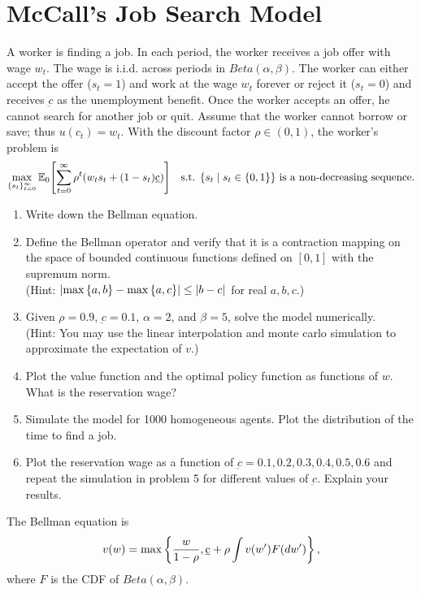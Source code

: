 \documentclass[12pt]{article}
\begin{document}
\section{McCall's Job Search Model}
A worker is finding a job. In each period, the worker receives 
a job offer with wage $w_t$. The wage is i.i.d. across periods 
in $Beta(\alpha,\beta)$. The worker can either 
accept the offer ($s_t=1$) and work at the wage $w_t$ forever 
or reject it ($s_t=0$) and receives $\underbar{c}$ as the 
unemployment benefit. Once the worker accepts an offer, he 
cannot search for another job or quit. Assume that the worker 
cannot borrow or save; thus $u(c_t)=w_t$. 
With the discount factor $\rho\in(0,1)$, the worker's problem 
is 
\begin{equation*}
    \max_{\{s_t\}_{t=0}^\infty} \E_0\sbrc{\sum_{t=0}^\infty \rho^t(w_ts_t+(1-s_t)\underbar{c})}\quad \text{s.t. $\Set{s_t}{s_t\in\set{0,1}}$ is a non-decreasing sequence}.
\end{equation*}
\begin{enumerate}
    \item Write down the Bellman equation.
    \item Define the Bellman operator and verify that it is a 
    contraction mapping on the space of bounded continuous functions 
    defined on $[0,1]$ with the supremum norm.\\
    (Hint: $\left\lvert {\max\left\{ {a,b} \right\}-\max\left\{ {a,c} \right\}} \right\rvert\leq\left\lvert {b-c} \right\rvert$ for real $a,b,c$.)
    \item Given $\rho = 0.9$, $\underbar{c} = 0.1$, $\alpha = 2$, 
    and $\beta = 5$, solve the model numerically.\\
    (Hint: You may use the linear interpolation and monte carlo simulation to 
    approximate the expectation of $v$.)
    \item Plot the value function and the optimal policy function as functions 
    of $w$. What is the reservation wage? 
    \item Simulate the model for 1000 homogeneous agents. Plot the distribution 
    of the time to find a job. 
    \item Plot the reservation wage as a function of $\underbar{c} = 0.1, 0.2, 0.3,
    0.4, 0.5, 0.6$ and repeat the simulation in problem 5 for different values of 
    $\underbar{c}$. Explain your results.
\end{enumerate}

\begin{sol}[4.1]
    The Bellman equation is
    \vspace{-1em}
    \begin{equation*}
        v(w) = \max \left\{ {\frac{w}{1-\rho}, \underbar{c} + \rho \int v(w') F(dw')} \right\},
    \end{equation*}
    where $F$ is the CDF of $Beta(\alpha,\beta)$.
    \solend
\end{sol}
\end{document}

